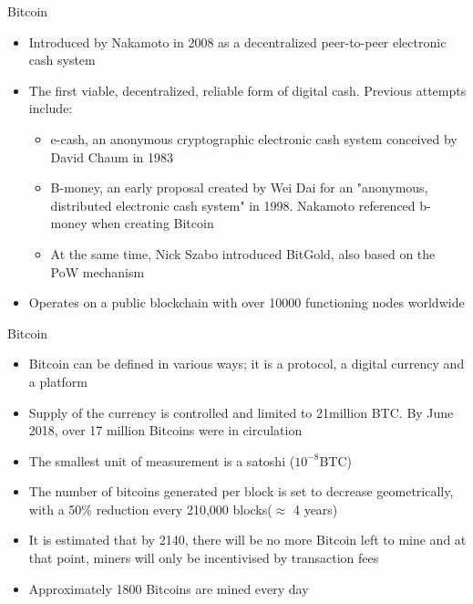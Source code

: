 \documentclass[11pt]{beamer}
\begin{document}

\begin{frame}{Bitcoin}
	\begin{itemize}
		\item Introduced by Nakamoto in 2008 as a decentralized peer-to-peer electronic cash system
		\item The first viable, decentralized, reliable form of digital cash. Previous attempts include:
		\begin{itemize}
			\item e-cash, an anonymous cryptographic electronic cash system conceived by David Chaum in 1983
			\item B-money, an early proposal created by Wei Dai for an "anonymous, distributed electronic cash system" in 1998. Nakamoto referenced b-money when creating Bitcoin
			\item At the same time, Nick Szabo introduced BitGold, also based on the PoW mechanism
		\end{itemize}
		\item Operates on a public blockchain with over 10000 functioning nodes worldwide
	\end{itemize}
\end{frame}



\begin{frame}{Bitcoin}
	\begin{itemize}
		\item Bitcoin can be defined in various ways; it is a protocol, a digital currency and a platform
		\item Supply of the currency is controlled and limited to 21million BTC. By June 2018, over 17 million Bitcoins were in circulation
		\item The smallest unit of measurement is a satoshi ($ 10^{-8}$BTC)
		\item The number of bitcoins generated per block is set to decrease geometrically, with a 50\% reduction every 210,000 blocks($\approx$ 4 years)
		\item It is estimated that by 2140, there will be no more Bitcoin left to mine and at that point, miners will only be incentivised by transaction fees
		\item Approximately 1800 Bitcoins are mined every day
		\end{itemize}
\end{frame}
\end{document}
